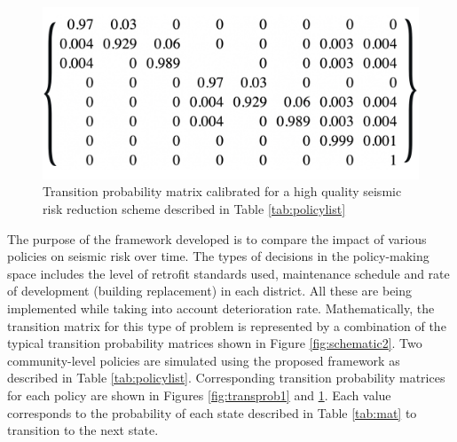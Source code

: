 \begin{figure}[htbp!]
 \centering
  \includegraphics[width=.7\linewidth]{Figures/trans_high.jpg}
  \caption{Transition probability matrix calibrated for a high quality seismic risk reduction scheme described in Table \ref{tab:policylist}}
  \label{fig:transprob2}
\end{figure} 



The purpose of the framework developed is to compare the impact of
various policies on seismic risk over time. The types of decisions in the policy-making space includes the level of retrofit standards used, maintenance schedule and rate of development (building replacement) in each district. All these are being implemented while taking into account deterioration rate. Mathematically, the transition matrix for this type of problem is represented by a combination of the typical transition probability matrices shown in Figure \ref{fig:schematic2}. Two community-level policies are simulated using the proposed framework as described in Table \ref{tab:policylist}. Corresponding transition probability matrices for each policy are shown in Figures \ref{fig:transprob1} and \ref{fig:transprob2}. Each value corresponds to the probability of each state described in Table \ref{tab:mat} to  transition to the next state.

